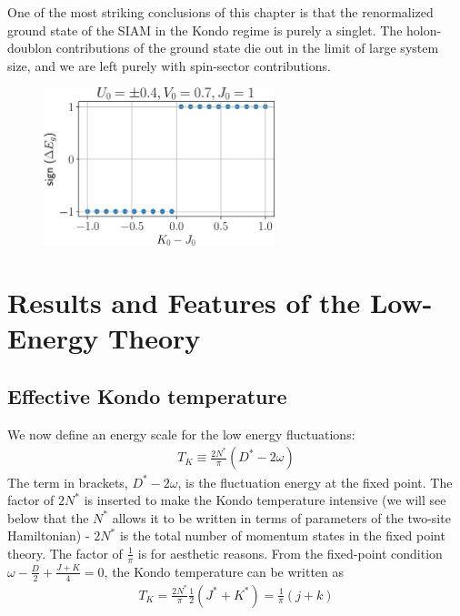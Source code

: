 \documentclass[12pt,twoside]{report}
\numberwithin{equation}{section}
\begin{document}
\pb One of the most striking conclusions of this chapter is that the renormalized ground state of the SIAM in the Kondo regime is purely a singlet. The holon-doublon contributions of the ground state die out in the limit of large system size, and we are left purely with spin-sector contributions.
\begin{figure}[htpb]
	\centering
	\includegraphics[width=0.6\textwidth]{../figures/gstate.pdf}
	\label{fig_gstate}
\end{figure}
\vspace{\fill}

\chapter{Results and Features of the Low-Energy Theory}
\label{results}
\section{Effective Kondo temperature}
We now define an energy scale for the low energy fluctuations:
\begin{equation}\begin{aligned}
	T_K \equiv \frac{2N^*}{\pi}\left(D^* - 2\omega\right) 
\end{aligned}\end{equation}
The term in brackets, \(D^* - 2\omega\), is the fluctuation energy at the fixed point. The factor of \(2N^*\) is inserted to make the Kondo temperature intensive (we will see below that the \(N^*\) allows it to  be written in terms of parameters of the two-site Hamiltonian) - \(2N^*\) is the total number of momentum states in the fixed point theory. The factor of \(\frac{1}{\pi}\) is for aesthetic reasons. From the fixed-point condition \(\omega - \frac{D}{2} + \frac{J + K}{4} = 0\), the Kondo temperature can be written as
\begin{equation}\begin{aligned}
	T_K = \frac{2N^*}{\pi}\frac{1}{2}\left(J^* + K^*\right) = \frac{1}{\pi}\left( j + k \right) 
\end{aligned}\end{equation}
\end{document}
